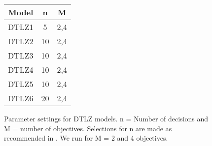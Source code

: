 \documentclass[10pt,journal,cspaper,compsoc]{IEEEtran}
\begin{document}
\begin{figure}
\begin{tabular}{|c|c|c|} \hline
Model & n & M \\ \hline
DTLZ1 & 5   & 2,4  \\
DTLZ2 & 10 & 2,4  \\
DTLZ3 & 10 & 2,4  \\
DTLZ4 & 10 & 2,4  \\
DTLZ5 & 10 & 2,4  \\
DTLZ6 & 20 & 2,4  \\ \hline
\end{tabular}
\caption{Parameter settings for DTLZ models.  n = Number of decisions and M = number of objectives.   Selections for n are made as recommended in \cite{dtlz2001a}.  We run for M = 2 and 4 objectives.}
\end{figure}
\end{document}
